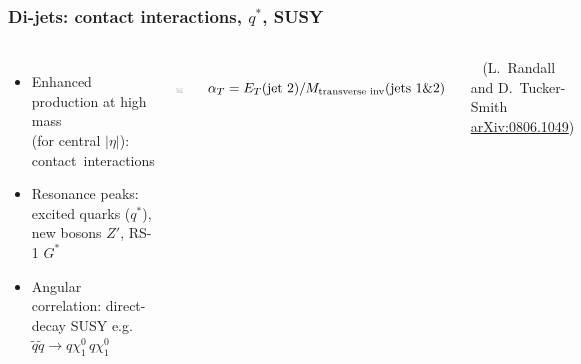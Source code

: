 \documentclass[compress]{beamer}
\begin{document}
\begin{frame}
\frametitle{Di-jets: contact interactions, $q^*$\hspace{-0.21 cm}, \hspace{0.1 cm}SUSY}

\vfill
\begin{columns}
\begin{itemize}
\item Enhanced production at high mass \\ (for central $|\eta|$): \mbox{contact interactions\hspace{-1 cm}}

\item Resonance peaks: excited quarks ($q^*$), new bosons $Z'$, RS-1 $G^*$

\item Angular correlation: direct-decay SUSY e.g.\ $\tilde{q}\tilde{q} \to q\chi^0_1 \, q\chi^0_1$
\end{itemize}

\vspace{0.2 cm}
\mbox{ } \hfill \includegraphics[width=0.75\linewidth]{susy_dijet_angles_transverse.png} \hfill \mbox{ }

\mbox{ } \hfill \hfill {\scriptsize $\alpha_T = E_T(\mbox{jet 2}) / M_{\mbox{\scriptsize transverse inv}}(\mbox{jets 1\&2})$} \hfill \mbox{ }

\mbox{ } \hfill \hfill {\scriptsize (L.\ Randall and D.\ Tucker-Smith \textcolor{blue}{\href{http://arxiv.org/abs/0806.1049}{arXiv:0806.1049}})} \hfill \mbox{ }


\end{columns}
\end{frame}
\end{document}
